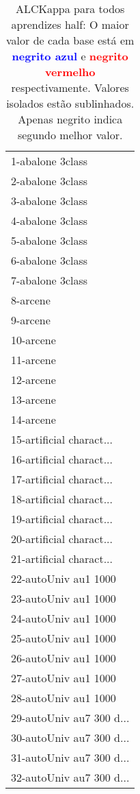 \begin{table}[h]
\caption{ALCKappa para todos aprendizes half: O maior valor de cada base está em \textcolor{blue}{\textbf{negrito azul}} e \textcolor{red}{\textbf{negrito vermelho}} respectivamente. Valores isolados estão sublinhados. Apenas negrito indica segundo melhor valor.}
\begin{center}\begin{tabular}{l}
 & \\ \hline 1-abalone 3class &  \\
2-abalone 3class &  \\
3-abalone 3class &  \\
4-abalone 3class &  \\
5-abalone 3class &  \\
6-abalone 3class &  \\
7-abalone 3class &  \\ \hline
8-arcene &  \\
9-arcene &  \\
10-arcene &  \\
11-arcene &  \\
12-arcene &  \\
13-arcene &  \\
14-arcene &  \\ \hline
15-artificial charact... &  \\
16-artificial charact... &  \\
17-artificial charact... &  \\
18-artificial charact... &  \\
19-artificial charact... &  \\
20-artificial charact... &  \\
21-artificial charact... &  \\ \hline
22-autoUniv au1 1000 &  \\
23-autoUniv au1 1000 &  \\
24-autoUniv au1 1000 &  \\
25-autoUniv au1 1000 &  \\
26-autoUniv au1 1000 &  \\
27-autoUniv au1 1000 &  \\
28-autoUniv au1 1000 &  \\ \hline
29-autoUniv au7 300 d... &  \\
30-autoUniv au7 300 d... &  \\
31-autoUniv au7 300 d... &  \\
32-autoUniv au7 300 d... &  \\\end{tabular}\label{stratsALCKappa0AllReduxHalfb}
\end{center}
\end{table}
